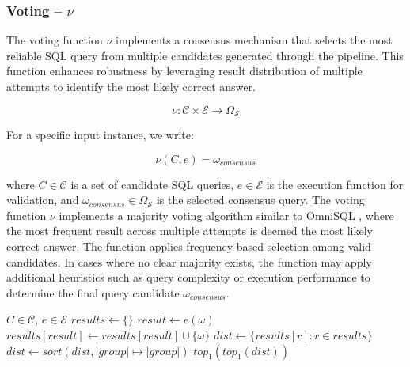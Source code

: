 \subsubsection{Voting – $\nu$}\label{design:voting-function}

The voting function $\nu$ implements a consensus mechanism that selects the most
reliable SQL query from multiple candidates generated through the pipeline.
This function enhances robustness by leveraging result distribution of multiple
attempts to identify the most likely correct answer.

$$
\nu: \mathcal{C} \times \mathcal{E} \rightarrow \Omega_{\mathcal{S}}
$$

\vspace{0.5em}

For a specific input instance, we write:

$$
\nu(C, e) = \omega_{consensus}
$$

\vspace{0.5em}

where $C \in \mathcal{C}$ is a set of candidate SQL queries, $e \in
\mathcal{E}$ is the execution function for validation, and $\omega_{consensus}
\in \Omega_{\mathcal{S}}$ is the selected consensus query. The voting function
$\nu$ implements a majority voting algorithm similar to OmniSQL
\citep{OmniSQL}, where the most frequent result across multiple attempts is
deemed the most likely correct answer. The function applies frequency-based
selection among valid candidates. In cases where no clear majority exists, the
function may apply additional heuristics such as query complexity or execution
performance to determine the final query candidate $\omega_{consensus}$.

\begin{algorithm}
\caption{$\nu$ - Consensus Voting}\label{algorithms:nu}
\begin{algorithmic}[1]
\Require $C \in \mathcal{C}$, $e \in \mathcal{E}$
\State $results \gets \{\}$                               
                                      
    \State $result \gets e(\omega)$                       
    \State $results[result] \gets results[result] \cup \{\omega\}$
\EndFor
\State $dist \gets \{results[r] : r \in results\}$        
\State $dist \gets sort(dist, |group| \mapsto |group|)$   
\State \Return $top_1(top_1(dist))$                       
\end{algorithmic}
\end{algorithm}
